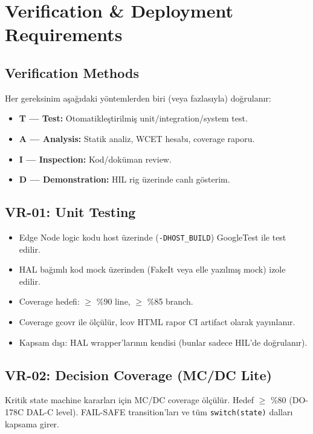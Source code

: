 \section{Verification \& Deployment Requirements}

\subsection{Verification Methods}
Her gereksinim aşağıdaki yöntemlerden biri (veya fazlasıyla) doğrulanır:
\begin{itemize}
    \item \textbf{T — Test:} Otomatikleştirilmiş unit/integration/system test.
    \item \textbf{A — Analysis:} Statik analiz, WCET hesabı, coverage raporu.
    \item \textbf{I — Inspection:} Kod/doküman review.
    \item \textbf{D — Demonstration:} HIL rig üzerinde canlı gösterim.
\end{itemize}

\subsection{VR-01: Unit Testing}
\begin{itemize}
    \item Edge Node logic kodu host üzerinde (\texttt{-DHOST\_BUILD}) GoogleTest ile test edilir.
    \item HAL bağımlı kod mock üzerinden (FakeIt veya elle yazılmış mock) izole edilir.
    \item Coverage hedefi: $\geq$ \%90 line, $\geq$ \%85 branch.
    \item Coverage gcovr ile ölçülür, lcov HTML rapor CI artifact olarak yayınlanır.
    \item Kapsam dışı: HAL wrapper'larının kendisi (bunlar sadece HIL'de doğrulanır).
\end{itemize}

\subsection{VR-02: Decision Coverage (MC/DC Lite)}
Kritik state machine kararları için MC/DC coverage ölçülür. Hedef $\geq$ \%80 (DO-178C DAL-C level). FAIL-SAFE transition'ları ve tüm \texttt{switch(state)} dalları kapsama girer.

